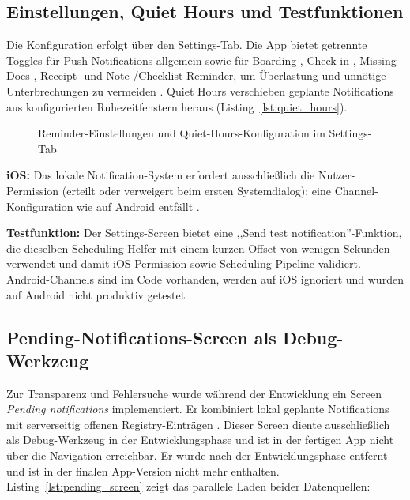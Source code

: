 \subsection{Einstellungen, Quiet Hours und Testfunktionen}
\label{subsec:settings-quiet-hours}

Die Konfiguration erfolgt über den Settings-Tab. Die App bietet getrennte Toggles
für Push Notifications allgemein sowie für Boarding-, Check-in-, Missing-Docs-,
Receipt- und Note-/Checklist-Reminder, um Überlastung und unnötige Unterbrechungen
zu vermeiden \cite{ozdemir2025echoes,visuri2019notifications}. Quiet Hours verschieben
geplante Notifications aus konfigurierten Ruhezeitfenstern heraus
(Listing~\ref{lst:quiet_hours}).

\begin{figure}[H]
  \centering
  \caption{Reminder-Einstellungen und Quiet-Hours-Konfiguration im Settings-Tab}
  \label{fig:settings_notif}
\end{figure}

\textbf{iOS:} Das lokale Notification-System erfordert ausschließlich die
Nutzer-Permission (erteilt oder verweigert beim ersten Systemdialog); eine
Channel-Konfiguration wie auf Android entfällt \cite{appleLocalNotif,expoNotificationsSDK}.

\textbf{Testfunktion:} Der Settings-Screen bietet eine ,,Send test notification''-Funktion,
die dieselben Scheduling-Helfer mit einem kurzen Offset von wenigen Sekunden verwendet
und damit iOS-Permission sowie Scheduling-Pipeline validiert. Android-Channels sind
im Code vorhanden, werden auf iOS ignoriert und wurden auf Android nicht produktiv
getestet \cite{androidNotifChannels}.

\subsection{Pending-Notifications-Screen als Debug-Werkzeug}
\label{subsec:pending-screen}

Zur Transparenz und Fehlersuche wurde während der Entwicklung ein Screen \emph{Pending notifications}
implementiert.
Er kombiniert lokal geplante Notifications mit serverseitig offenen Registry-Einträgen 
\cite{expoNotificationsSDK}.
Dieser Screen diente ausschließlich als Debug-Werkzeug in der Entwicklungsphase und ist in der
fertigen App nicht über die Navigation erreichbar.
Er wurde nach der Entwicklungsphase entfernt und ist in der finalen App-Version nicht mehr enthalten.
Listing~\ref{lst:pending_screen} zeigt das parallele Laden beider Datenquellen:

